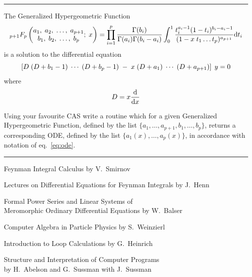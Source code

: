 \documentclass[11pt]{article}
\newcommand{\titleb}[2]{{\color{Blue}{\LARGE #1}\hfill{\Large #2}\vspace{-2mm}\par\rule{\textwidth}{1pt}\vs}}
\newcommand{\titlea}[1]{\titleb{#1}{}}
\newcommand{\people}[1]{{\color{Magenta}#1}}
\begin{document}
\titlea{VI. Hypergeometric Functions}
The Generalized Hypergeometric Function
$$
 _{p+1}F_p
\left(
\begin{matrix}
  a_1,\; a_2,\; \ldots,\; a_{p+1}
  \\
  b_1,\; b_2,\; \ldots,\; b_{p}
\end{matrix}
;\; x
\right)
=
\prod_{i=1}^{p}\frac{\Gamma(b_i)}{\Gamma(a_i)\Gamma(b_i-a_i)}
\int_0^1 \frac{t_i^{a_i-1} (1-t_i)^{b_i-a_i-1}}{(1-x\; t_1\ldots t_{p})^{a_{p+1}}} \mathrm{d} t_i
$$%
is a solution to the differential equation
$$
\left[
 D \; (D+b_1-1)\;\cdots\;(D+b_p-1)\; - \; x\;(D+a_1)\;\cdots\;(D+a_{p+1})
\right] \; y = 0
$$%
where
$$D = x\frac{\mathrm{d}}{\mathrm{d} x}$$

\vs
{}\par
Using your favourite CAS write a routine which for a given Generalized Hypergeometric Function, defined by the list $\{a_1,\ldots,a_{p+1},b_1,\ldots,b_p\}$, returns a corresponding ODE, defined by the list $\{a_1(x),\ldots,a_p(x)\}$, in accordance with notation of eq.~\eqref{eq:ode}.

\newpage


\titlea{Reading List}
\bi \item \people{Feynman Integral Calculus} by V.~Smirnov
    \item \people{Lectures on Differential Equations for Feynman Integrals} by J.~Henn
    \item \people{Formal Power Series and Linear Systems of \\ Meromorphic Ordinary Differential Equations} by W.~Balser
    \item \people{Computer Algebra in Particle Physics} by S.~Weinzierl
    \item \people{Introduction to Loop Calculations} by G.~Heinrich
    \item \people{Structure and Interpretation of Computer Programs}\\by H.~Abelson and G.~Sussman with J.~Sussman
    \ei
\end{document}
